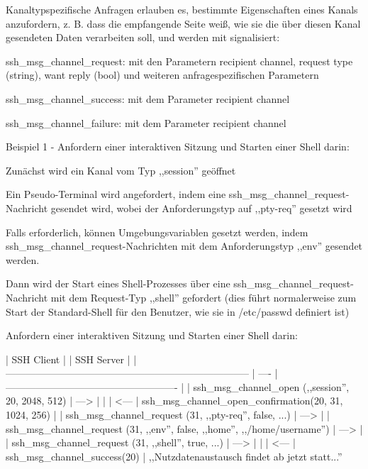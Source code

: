 \documentclass[a4paper]{article}
\begin{document}
\begin{multicols}{3}
\begin{itemize*}
\begin{itemize*}
            \end{itemize*}
            \item Kanaltypspezifische Anfragen erlauben es, bestimmte Eigenschaften eines Kanals anzufordern, z. B. dass die empfangende Seite weiß, wie sie die über diesen Kanal gesendeten Daten verarbeiten soll, und werden mit signalisiert:
            \begin{itemize*}
                  \item ssh\_msg\_channel\_request: mit den Parametern recipient channel, request type (string), want reply (bool) und weiteren anfragespezifischen Parametern
                  \item ssh\_msg\_channel\_success: mit dem Parameter recipient channel
                  \item ssh\_msg\_channel\_failure: mit dem Parameter recipient channel
            \end{itemize*}
            \item Beispiel 1 - Anfordern einer interaktiven Sitzung und Starten einer Shell darin:
            \begin{itemize*}
                  \item Zunächst wird ein Kanal vom Typ ,,session'' geöffnet
                  \item Ein Pseudo-Terminal wird angefordert, indem eine ssh\_msg\_channel\_request-Nachricht gesendet wird, wobei der Anforderungstyp auf ,,pty-req'' gesetzt wird
                  \item Falls erforderlich, können Umgebungsvariablen gesetzt werden, indem ssh\_msg\_channel\_request-Nachrichten mit dem Anforderungstyp ,,env'' gesendet werden.
                  \item Dann wird der Start eines Shell-Prozesses über eine ssh\_msg\_channel\_request-Nachricht mit dem Request-Typ ,,shell'' gefordert (dies führt normalerweise zum Start der Standard-Shell für den Benutzer, wie sie in /etc/passwd definiert ist)
                  \item Anfordern einer interaktiven Sitzung und Starten einer Shell darin:

                  | SSH Client | | SSH Server | | -------------------------------------------------------------------------- | ---- | ---------------------------------------------------- | | ssh\_msg\_channel\_open (,,session'', 20, 2048, 512) | --->{} | | | <--- | ssh\_msg\_channel\_open\_confirmation(20, 31, 1024, 256) | | ssh\_msg\_channel\_request (31, ,,pty-req'', false, ...) | --->{} | | ssh\_msg\_channel\_request (31, ,,env'', false, ,,home'', ,,/home/username'') | --->{} | | ssh\_msg\_channel\_request (31, ,,shell'', true, ...) | --->{} | | | <--- | ssh\_msg\_channel\_success(20) |
                  ,,Nutzdatenaustausch findet ab jetzt statt...''
            \end{itemize*}
      \end{itemize*}


\end{multicols}
\end{document}
